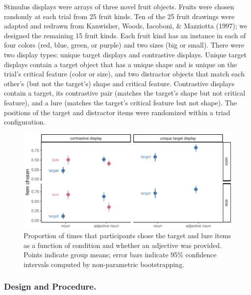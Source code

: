 \documentclass[10pt, letterpaper]{article}
\newenvironment{CodeChunk}{}{}
\begin{document}
Stimulus displays were arrays of three novel fruit objects. Fruits were
chosen randomly at each trial from 25 fruit kinds. Ten of the 25 fruit
drawings were adapted and redrawn from Kanwisher, Woods, Iacoboni, \&
Mazziotta (1997); we designed the remaining 15 fruit kinds. Each fruit
kind has an instance in each of four colors (red, blue, green, or
purple) and two sizes (big or small). There were two display types:
unique target displays and contrastive displays. Unique target displays
contain a target object that has a unique shape and is unique on the
trial's critical feature (color or size), and two distractor objects
that match each other's (but not the target's) shape and critical
feature. Contrastive displays contain a target, its contrastive pair
(matches the target's shape but not critical feature), and a lure
(matches the target's critical feature but not shape). The positions of
the target and distractor items were randomized within a triad
configuration.

\begin{CodeChunk}
\begin{figure}[tb]

{\centering \includegraphics{figs/e1_fig-1} 

}

\caption[Proportion of times that participants chose the target and lure items as a function of condition and whether an adjective was provided]{Proportion of times that participants chose the target and lure items as a function of condition and whether an adjective was provided. Points indicate group means; error bars indicate 95\% confidence intervals computed by non-parametric bootstrapping.}\label{fig:e1_fig}
\end{figure}
\end{CodeChunk}

\subsubsection{Design and Procedure.}\label{design-and-procedure.}
\end{document}
